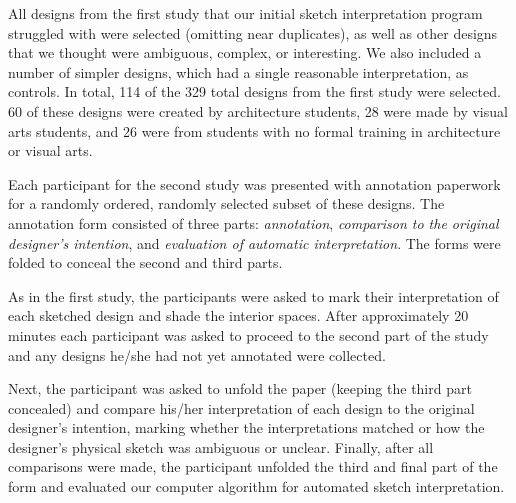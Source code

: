 All designs from the first study that our initial sketch
interpretation program struggled with were selected (omitting near
duplicates), as well as other designs that we thought were ambiguous,
complex, or interesting.  We also included a number of simpler
designs, which had a single reasonable interpretation, as controls.
In total, 114 of the 329 total designs from the first study were
selected.  60 of these designs were created by architecture students,
28 were made by visual arts students, and 26 were from students with
no formal training in architecture or visual arts.
%
%


Each participant for the second study was presented with annotation
paperwork for a randomly ordered, randomly selected subset of these
designs.  The annotation form consisted of three parts: {\em
  annotation}, {\em comparison to the original designer's intention}, and
{\em evaluation of automatic interpretation}.  The forms were folded
to conceal the second and third parts.

As in the first study, the participants were asked to mark their
interpretation of each sketched design and shade the interior spaces.
After approximately 20 minutes each participant was asked
to proceed to the second part of the study and any designs he/she had
not yet annotated were collected.

Next, the participant was asked to unfold the paper (keeping the third part
concealed) and compare his/her interpretation of each design to the
original designer's intention, marking whether the interpretations matched
or how the designer's physical sketch was ambiguous or unclear.  Finally,
after all comparisons were made, the participant unfolded the third and
final part of the form and evaluated our computer algorithm for automated
sketch interpretation.




